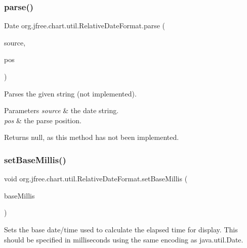 \subsubsection{\texorpdfstring{parse()}{parse()}}
{\footnotesize\ttfamily Date org.\+jfree.\+chart.\+util.\+Relative\+Date\+Format.\+parse (\begin{DoxyParamCaption}\item[{String}]{source,  }\item[{Parse\+Position}]{pos }\end{DoxyParamCaption})}

Parses the given string (not implemented).


\begin{DoxyParams}{Parameters}
{\em source} & the date string. \\
\hline
{\em pos} & the parse position.\\
\hline
\end{DoxyParams}
\begin{DoxyReturn}{Returns}
{\ttfamily null}, as this method has not been implemented. 
\end{DoxyReturn}
\mbox{\label{classorg_1_1jfree_1_1chart_1_1util_1_1_relative_date_format_a1f94b91f33e77bd00bf094e6c24f32db}} 
\subsubsection{\texorpdfstring{set\+Base\+Millis()}{setBaseMillis()}}
{\footnotesize\ttfamily void org.\+jfree.\+chart.\+util.\+Relative\+Date\+Format.\+set\+Base\+Millis (\begin{DoxyParamCaption}\item[{long}]{base\+Millis }\end{DoxyParamCaption})}

Sets the base date/time used to calculate the elapsed time for display. This should be specified in milliseconds using the same encoding as {\ttfamily java.\+util.\+Date}.


